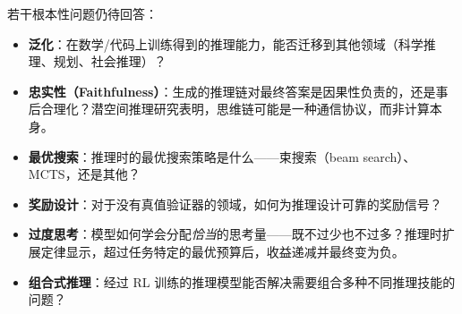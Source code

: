 \begin{questionbox}[RL 用于推理中的开放问题]
若干根本性问题仍待回答：

\begin{itemize}
  \item \textbf{泛化}：在数学/代码上训练得到的推理能力，能否迁移到其他领域（科学推理、规划、社会推理）？
  \item \textbf{忠实性（Faithfulness）}：生成的推理链对最终答案是因果性负责的，还是事后合理化？潜空间推理研究表明，思维链可能是一种通信协议，而非计算本身。
  \item \textbf{最优搜索}：推理时的最优搜索策略是什么——束搜索（beam search）、MCTS，还是其他？
  \item \textbf{奖励设计}：对于没有真值验证器的领域，如何为推理设计可靠的奖励信号？
  \item \textbf{过度思考}：模型如何学会分配\emph{恰当}的思考量——既不过少也不过多？推理时扩展定律显示，超过任务特定的最优预算后，收益递减并最终变为负。
  \item \textbf{组合式推理}：经过 RL 训练的推理模型能否解决需要组合多种不同推理技能的问题？

\end{itemize}
\end{questionbox}
